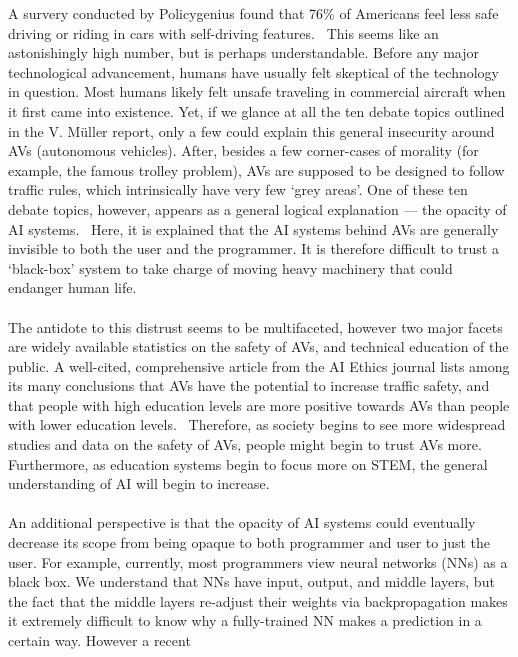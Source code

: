 \documentclass[12pt]{article}
\newcommand{\supercite}[1]{~{\textsuperscript{\cite{#1}}}}
\begin{document}
A survery conducted by Policygenius found that 76\% of Americans feel less
safe driving or riding in cars with self-driving features.\supercite{policy-genius-survey}
This seems like an astonishingly high number, but is perhaps understandable.
Before any major technological advancement, humans have usually felt skeptical
of the technology in question. Most humans likely felt unsafe traveling
in commercial aircraft when it first came into existence. Yet, if we glance at all the
ten debate topics outlined in the V. Müller report, only a few could explain 
this general insecurity around AVs (autonomous vehicles). After, besides a few
corner-cases of morality (for example, the famous trolley problem), AVs are
supposed to be designed to follow traffic rules, which intrinsically have 
very few `grey areas'. One of these ten debate topics, however, appears
as a general logical explanation --- the opacity of AI systems.\supercite{sep-ethics-ai}
Here, it is explained that the AI systems behind AVs are generally invisible
to both the user and the programmer. It is therefore difficult to trust a `black-box'
system to take charge of moving heavy machinery that could endanger human life.\\
\vspace{0in}\\
The antidote to this distrust seems to be multifaceted, however two major facets
are widely available statistics on the safety of AVs, and technical education of the public.
A well-cited, comprehensive article from the AI Ethics journal lists
among its many conclusions that AVs have the potential to increase traffic safety,
and that people with high education levels are more positive towards AVs
than people with lower education levels.\supercite{Othman2021-xr} Therefore,
as society begins to see more widespread studies and data on the safety of AVs,
people might begin to trust AVs more. Furthermore, as education systems begin
to focus more on STEM, the general understanding of AI will begin to increase.\\
\vspace{0in}\\
An additional perspective is that the opacity of AI systems could eventually
decrease its scope from being opaque to both programmer and user to just the user.
For example, currently, most programmers view neural networks (NNs) as a black box. We
understand that NNs have input, output, and middle layers, but the fact that the middle
layers re-adjust their weights via backpropagation makes it extremely difficult to
know why a fully-trained NN makes a prediction in a certain way. However a recent
\end{document}
